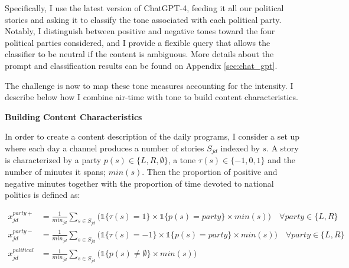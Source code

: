 \documentclass[12pt]{article}
\begin{document}
	
	
	Specifically, I use the latest version of ChatGPT-4, feeding it all our political stories and asking it to classify the tone associated with each political party. Notably, I distinguish between positive and negative tones toward the four political parties considered, and I provide a flexible query that allows the classifier to be neutral if the content is ambiguous. More details about the prompt and classification results can be found on Appendix \ref{sec:chat_gpt}.
	


The challenge is now to map these tone measures accounting for the intensity. I describe below how I combine air-time with tone to build content characteristics. 
	
	
	
	
	\textbf{Building Content Characteristics}
	
	
	In order to create a content description of the daily programs, I consider a set up where each day a channel produces a number of stories $S_{jd}$ indexed by $s$. A story is characterized by a party $ p(s) \in \{L, R, \emptyset\} $, a tone $ \tau(s) \in \{-1, 0, 1\} $ and the number of minutes it spans; $min(s)$. Then the proportion of positive and negative minutes together with the proportion of time devoted to national politics is defined as: 
	
	

		\begin{equation}\label{eq:controls}
		\begin{aligned}
			x_{jd}^{party+}&= \frac{1}{min_{jd}} \sum_{s \in S_{jd}}\bigg(\mathds{1}\{\tau(s)=1\} \times \mathds{1}\{p(s)=party\}\times min(s) \bigg) \quad \forall party \in \{L,R\} \\
			x_{jd}^{party-}&= \frac{1}{min_{jd}} \sum_{s \in S_{jd}}\bigg( \mathds{1}\{\tau(s)=-1\} \times \mathds{1}\{p(s)=party\} \times min(s)\bigg) \quad \forall party \in \{L,R\} \\
			x_{jd}^{political}&=\frac{1}{min_{jd}} \sum_{s \in S_{jd}}\bigg(  \mathds{1}\{p(s)\neq\emptyset\}\times min(s) \bigg)
		\end{aligned}
	\end{equation} 
	
\end{document}
